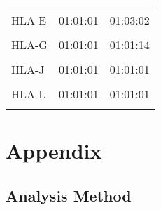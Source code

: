 \documentclass[
]{article}
\begin{document}
\begin{tabular}{lll}
\addlinespace
\cellcolor{gray!6}{HLA-DRB9} & \cellcolor{gray!6}{Not typed} & \cellcolor{gray!6}{Not typed}\\
HLA-E & 01:01:01 & 01:03:02\\
\cellcolor{gray!6}{HLA-F} & \cellcolor{gray!6}{01:03:01} & \cellcolor{gray!6}{01:01:01}\\
HLA-G & 01:01:01 & 01:01:14\\
\cellcolor{gray!6}{HLA-H} & \cellcolor{gray!6}{02:04} & \cellcolor{gray!6}{02:03}\\
\addlinespace
HLA-J & 01:01:01 & 01:01:01\\
\cellcolor{gray!6}{HLA-K} & \cellcolor{gray!6}{01:01:01} & \cellcolor{gray!6}{01:03}\\
HLA-L & 01:01:01 & 01:01:01\\
\cellcolor{gray!6}{HLA-V} & \cellcolor{gray!6}{01:01:01} & \cellcolor{gray!6}{01:01:01}\\
\bottomrule
\end{tabular}
\endgroup{}

\hypertarget{appendix}{%
\section{Appendix}\label{appendix}}

\hypertarget{analysis-method}{%
\subsection{Analysis Method}\label{analysis-method}}
\end{document}
